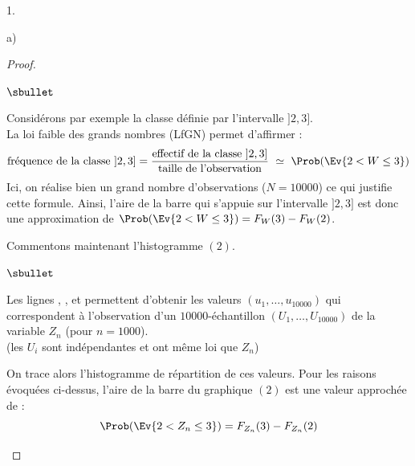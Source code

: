 \documentclass[11pt]{article}%
\begin{document}
\begin{noliste}{1.}
\begin{noliste}{a)}
\begin{proof}
\begin{noliste}{$\sbullet$}
    \item Considérons par exemple la classe définie par l'intervalle
      $]2, 3]$.\\
      La loi faible des grands nombres (LfGN) permet d'affirmer :
      \[
      \mbox{fréquence de la classe $]2, 3]$} = \dfrac{\mbox{effectif
          de la classe $]2, 3]$}}{\mbox{taille de l'observation}} \
      \simeq \ \Prob(\Ev{2 < W \leq 3})
      \]
      Ici, on réalise bien un grand nombre d'observations ($N =
      10000$) ce qui justifie cette formule. Ainsi, l'aire de la barre
      qui s'appuie sur l'intervalle $]2, 3]$ est donc une
      approximation de $\Prob(\Ev{2 < W \leq 3}) = F_W(3) - F_W(2)$.
    \end{noliste}
    Commentons maintenant l'histogramme $(2)$.
    \begin{noliste}{$\sbullet$}
    \item Les lignes , , et  permettent
      d'obtenir les valeurs $(u_1, \ldots, u_{10000})$ qui
      correspondent à l'observation d'un $10000$-échantillon $(U_1,
      \ldots, U_{10000})$ de la variable $Z_n$ (pour $n = 1000$).\\
      (les $U_i$ sont indépendantes et ont même loi que $Z_n$)
      
    \item On trace alors l'histogramme de répartition de ces
      valeurs. Pour les raisons évoquées ci-dessus, l'aire de la barre
      du graphique $(2)$ est une valeur approchée de :
      \[
      \Prob(\Ev{2 < Z_n \leq 3}) = F_{Z_n}(3) - F_{Z_n}(2)
      \]
    \end{noliste}%


    \newpage



\end{proof}
\end{noliste}
\end{noliste}
\end{document}
